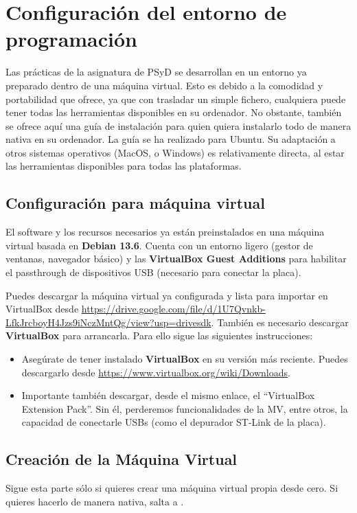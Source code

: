 \documentclass[../main.tex]{subfiles}
\begin{document}
\section{Configuración del entorno de programación}

    Las prácticas de la asignatura de PSyD se desarrollan en un entorno ya preparado dentro de una máquina virtual. Esto es debido a la comodidad y portabilidad que ofrece, ya que con trasladar un simple fichero, cualquiera puede tener todas las herramientas disponibles en su ordenador. No obstante, también se ofrece aquí una guía de instalación para quien quiera instalarlo todo de manera nativa en su ordenador. La guía se ha realizado para Ubuntu. Su adaptación a otros sistemas operativos (MacOS, o Windows) es relativamente directa, al estar las herramientas disponibles para todas las plataformas. 

    \subsection{Configuración para máquina virtual}\label{sub:vmconfig}
        El software y los recursos necesarios ya están preinstalados en una máquina virtual basada en \textbf{Debian 13.6}. Cuenta con un entorno ligero (gestor de ventanas, navegador básico) y las \textbf{VirtualBox Guest Additions} para habilitar el passthrough de dispositivos USB (necesario para conectar la placa).

        Puedes descargar la máquina virtual ya configurada y lista para importar en VirtualBox desde \url{https://drive.google.com/file/d/1U7Qvnkb-LfkJrcboyH4Jzs9iNczMntQg/view?usp=drivesdk}. También es necesario descargar \textbf{VirtualBox} para arrancarla. Para ello sigue las siguientes instrucciones:

        \begin{itemize}
            \item Asegúrate de tener instalado \textbf{VirtualBox} en su versión más reciente. Puedes descargarlo desde \url{https://www.virtualbox.org/wiki/Downloads}.
            \item Importante también descargar, desde el mismo enlace, el ``VirtualBox Extension Pack''. Sin él, perderemos funcionalidades de la MV, entre otros, la capacidad de conectarle USBs (como el depurador ST-Link de la placa).
        \end{itemize}

    \subsection{Creación de la Máquina Virtual}
        Sigue esta parte sólo si quieres crear una máquina virtual propia desde cero. Si quieres hacerlo de manera nativa, salta a .
\end{document}
